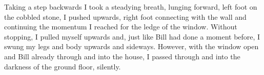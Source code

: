 Taking a step backwards I took a steadying breath, lunging forward, left foot on
the cobbled stone, I pushed upwards, right foot connecting with the wall and
continuing the momentum I reached for the ledge of the window. Without stopping,
I pulled myself upwards and, just like Bill had done a moment before, I swung my
legs and body upwards and sideways. However, with the window open and Bill
already through and into the house, I passed through and into the darkness of
the ground floor, silently.















